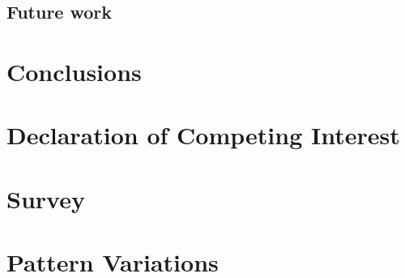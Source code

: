 \documentclass[final,5p,times]{elsarticle}%
\begin{document}
\begin{linenumbers}

    \subsection{Future work}
    \label{subsec:Future_work}
    

\section{Conclusions}
\label{sec:Conclusion}


\section{Declaration of Competing Interest}
\label{sec:DeclarationInterest}


%

\end{linenumbers}




\newpage
\clearpage
\appendix

\section{Survey}
\label{sec:Annexsurvey}


\section{Pattern Variations}
\label{sec:AnnexVariations}

\end{document}
